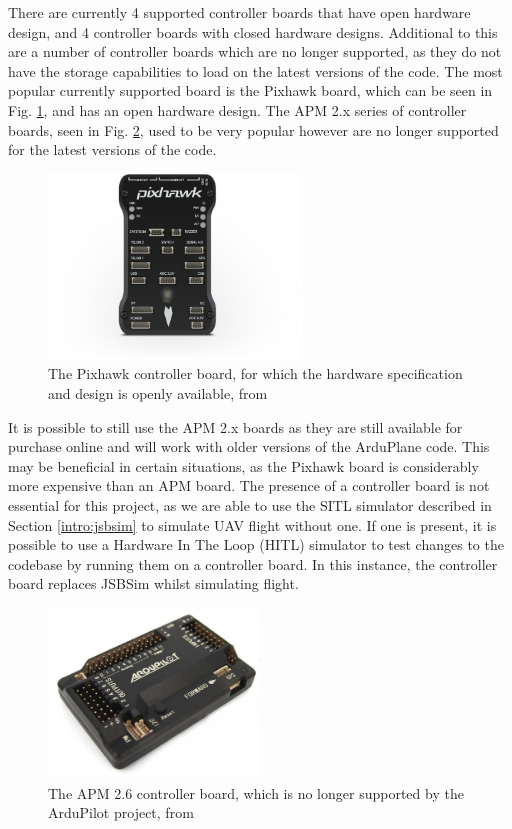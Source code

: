 There are currently 4 supported controller boards that have open hardware design, and 4 controller boards with closed hardware designs. Additional to this are a number of controller boards which are no longer supported, as they do not have the storage capabilities to load on the latest versions of the code. The most popular currently supported board is the Pixhawk board, which can be seen in Fig. \ref{fig:pixhawk}, and has an open hardware design. The APM 2.x series of controller boards, seen in Fig. \ref{fig:apm2}, used to be very popular however are no longer supported for the latest versions of the code.

\begin{figure}[htbp!] 
\centering    
\includegraphics[width=0.6\textwidth]{Pixhawk}
\caption[Pixhawk Controller Board]{The Pixhawk controller board, for which the hardware specification and design is openly available, from \cite{Pixhawk}}
\label{fig:pixhawk}
\end{figure}

It is possible to still use the APM 2.x boards as they are still available for purchase online and will work with older versions of the ArduPlane code. This may be beneficial in certain situations, as the Pixhawk board is considerably more expensive than an APM board. The presence of a controller board is not essential for this project, as we are able to use the SITL simulator described in Section \ref{intro:jsbsim} to simulate UAV flight without one. If one is present, it is possible to use a Hardware In The Loop (HITL) simulator to test changes to the codebase by running them on a controller board. In this instance, the controller board replaces JSBSim whilst simulating flight.

\begin{figure}[htbp!] 
\centering    
\includegraphics[width=0.5\textwidth]{APM2}
\caption[APM 2.6 Controller Board]{The APM 2.6 controller board, which is no longer supported by the ArduPilot project, from \cite{Apm2}}
\label{fig:apm2}
\end{figure}

